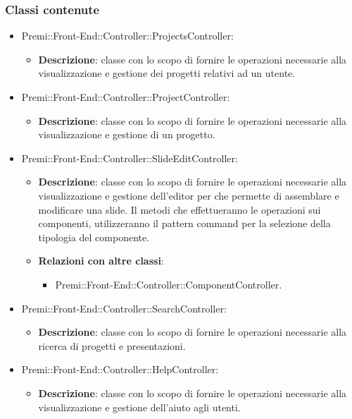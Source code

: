 	\subsubsection*{Classi contenute}
		\begin{itemize}
		 \item Premi::Front-End::Controller::ProjectsController:
			\begin{itemize}
				\item \textbf{Descrizione}: classe con lo scopo di fornire le operazioni necessarie alla visualizzazione e gestione dei progetti relativi ad un utente.
			\end{itemize}
		\item  Premi::Front-End::Controller::ProjectController: 
			 \begin{itemize}
				\item \textbf{Descrizione}: classe con lo scopo di fornire le operazioni necessarie alla visualizzazione e gestione di un progetto.
			\end{itemize}
		\item  Premi::Front-End::Controller::SlideEditController: 
			 \begin{itemize}
				\item \textbf{Descrizione}: classe con lo scopo di fornire le operazioni necessarie alla visualizzazione e gestione dell'editor per che permette di assemblare e modificare una slide. Il metodi che effettueranno le operazioni sui componenti, utilizzeranno il pattern command per la selezione della tipologia del componente.
				\item \textbf{Relazioni con altre classi}:
				\begin{itemize}
					\item Premi::Front-End::Controller::ComponentController.
				\end{itemize}
			\end{itemize}
		\item  Premi::Front-End::Controller::SearchController: 
			 \begin{itemize}
				\item \textbf{Descrizione}: classe con lo scopo di fornire le operazioni necessarie alla ricerca di progetti e presentazioni.
			\end{itemize}
		\item  Premi::Front-End::Controller::HelpController: 
			 \begin{itemize}
				\item \textbf{Descrizione}: classe con lo scopo di fornire le operazioni necessarie alla visualizzazione e gestione dell'aiuto agli utenti.

\end{itemize}
\end{itemize}
